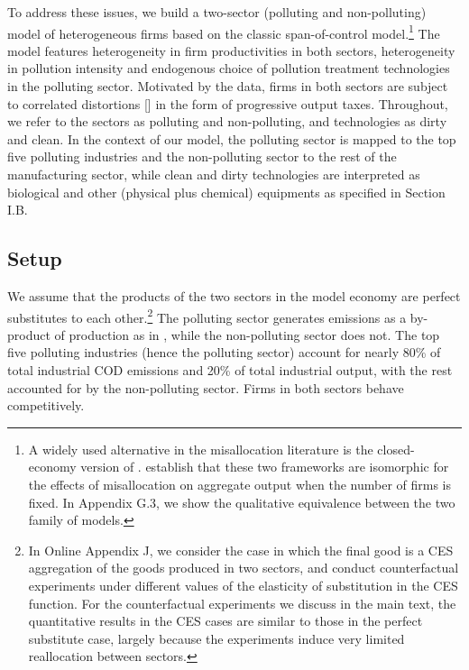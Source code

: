 \documentclass[AEJ]{AEA}
\begin{document}
To address these issues, we build a two-sector (polluting and non-polluting) model of heterogeneous firms based on the classic \citet{Lucas:1978b} span-of-control model.\footnote{A widely used alternative  in the misallocation literature is the closed-economy version of \citet{Melitz:2003}. \citet{HsiehKlenow:2009} establish that these two frameworks are isomorphic for the effects of misallocation on aggregate output when the number of firms is fixed. In Appendix G.3, we show the qualitative equivalence between the two family of models.} The model features heterogeneity in firm productivities in both sectors, heterogeneity in pollution intensity and endogenous choice of pollution treatment technologies in the polluting sector. Motivated by the data, firms in both sectors are subject to correlated distortions [\citet{RestucciaRogerson:2008}] in the form of progressive output taxes. Throughout, we refer to the sectors as polluting and non-polluting, and technologies as dirty and clean. In the context of our model, the polluting sector is mapped to the top five polluting industries and the non-polluting sector to the rest of the manufacturing sector, while clean and dirty technologies are interpreted as biological and other (physical plus chemical) equipments as specified in Section I.B.

\subsection{Setup}

We assume that the products of the two sectors in the model economy are perfect substitutes to each other.\footnote{In Online Appendix J, we consider the case in which the final good is a CES aggregation of the goods produced in two sectors, and conduct counterfactual experiments under different values of the elasticity of substitution in the CES function. For the counterfactual experiments we discuss in the main text, the quantitative results in the CES cases are similar to those in the perfect substitute case, largely because the experiments induce very limited reallocation between sectors.} The polluting sector generates emissions as a by-product of production as in \citet{CopelandTaylor:1994}, while the non-polluting sector does not. The top five polluting industries (hence the polluting sector) account for nearly 80\% of total industrial COD emissions and 20\% of total industrial output, with the rest accounted for by the non-polluting sector. Firms in both sectors behave competitively.
\end{document}
